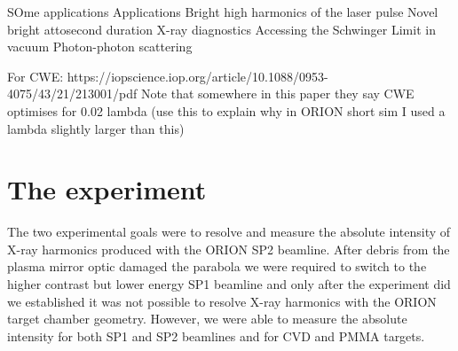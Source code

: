 SOme applications
Applications
Bright high harmonics of the laser pulse
Novel bright attosecond duration X-ray diagnostics
Accessing the Schwinger Limit in vacuum
Photon-photon scattering


For CWE: https://iopscience.iop.org/article/10.1088/0953-4075/43/21/213001/pdf
Note that somewhere in this paper they say CWE optimises for 0.02 lambda (use this to explain why in ORION short sim I used a lambda slightly larger than this)


\section{The experiment}
The two experimental goals were to resolve and measure the absolute intensity of X-ray harmonics produced with the ORION SP2 beamline. After debris from the plasma mirror optic damaged the parabola we were required to switch to the higher contrast but lower energy SP1 beamline and only after the experiment did we established it was not possible to resolve X-ray harmonics with the ORION target chamber geometry. However, we were able to measure the absolute intensity for both SP1 and SP2 beamlines and for CVD and PMMA targets.

